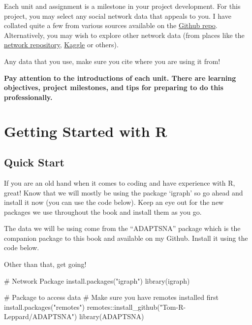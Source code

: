 \documentclass[
  letterpaper,
  DIV=11,
  numbers=noendperiod]{scrreprt}
\newenvironment{Shaded}{\begin{snugshade}}{\end{snugshade}}
\newcommand{\CommentTok}[1]{\textcolor[rgb]{0.37,0.37,0.37}{#1}}
\newcommand{\FunctionTok}[1]{\textcolor[rgb]{0.28,0.35,0.67}{#1}}
\newcommand{\NormalTok}[1]{\textcolor[rgb]{0.00,0.23,0.31}{#1}}
\newcommand{\SpecialCharTok}[1]{\textcolor[rgb]{0.37,0.37,0.37}{#1}}
\newcommand{\StringTok}[1]{\textcolor[rgb]{0.13,0.47,0.30}{#1}}
\begin{document}
Each unit and assignment is a milestone in your project development. For
this project, you may select any social network data that appeals to
you. I have collated quite a few from various sources available on the
\href{https://github.com/Tom-R-Leppard/SP25_SNA_Book/tree/main/Social\%20Network\%20Analysis\%20-\%20Data}{Github
repo}. Alternatively, you may wish to explore other network data (from
places like the \href{https://networkrepository.com/index.php}{network
repository}, \href{https://www.kaggle.com/}{Kaggle} or others).

Any data that you use, make sure you cite where you are using it from!

\textbf{Pay attention to the introductions of each unit. There are
learning objectives, project milestones, and tips for preparing to do
this professionally.}

\chapter{Getting Started with R}\label{getting-started-with-r}

\section{Quick Start}\label{quick-start}

If you are an old hand when it comes to coding and have experience with
R, great! Know that we will mostly be using the package `igraph' so go
ahead and install it now (you can use the code below). Keep an eye out
for the new packages we use throughout the book and install them as you
go.

The data we will be using come from the ``ADAPTSNA'' package which is
the companion package to this book and available on my Github. Install
it using the code below.

Other than that, get going!

\begin{Shaded}
\begin{Highlighting}[]
\CommentTok{\# Network Package}
\FunctionTok{install.packages}\NormalTok{(}\StringTok{"igraph"}\NormalTok{)}
\FunctionTok{library}\NormalTok{(igraph)}

\CommentTok{\# Package to access data}
\CommentTok{\# Make sure you have remotes installed first}
\FunctionTok{install.packages}\NormalTok{(}\StringTok{"remotes"}\NormalTok{)}
\NormalTok{remotes}\SpecialCharTok{::}\FunctionTok{install\_github}\NormalTok{(}\StringTok{"Tom{-}R{-}Leppard/ADAPTSNA"}\NormalTok{)}
\FunctionTok{library}\NormalTok{(ADAPTSNA)}
\end{Highlighting}
\end{Shaded}
\end{document}
